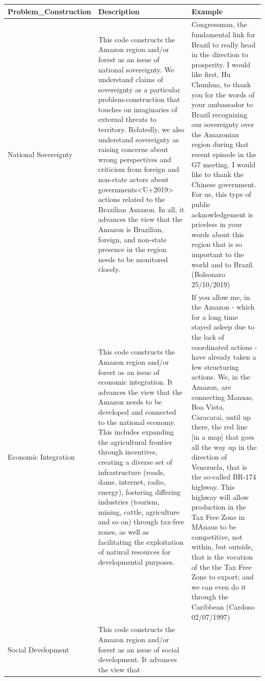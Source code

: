\documentclass[]{interact}
\theoremstyle{plain}%
\theoremstyle{definition}
\theoremstyle{remark}
\begin{document}
\begin{longtable}[]{@{}lll@{}}
\toprule
Problem\_Construction & Description & Example \\
\midrule
\endhead
National Sovereignty & This code constructs the Amazon region and/or
forest as an issue of national sovereignty. We understand claims of
sovereignty as a particular problem-construction that touches on
imaginaries of external threats to territory. Relatedly, we also
understand sovereignty as raising concerns about wrong perspectives and
criticism from foreign and non-state actors about
governments\textless U+2019\textgreater{} actions related to the
Brazilian Amazon. In all, it advances the view that the Amazon is
Brazilian, foreign, and non-state presence in the region needs to be
monitored closely. & Congressman, the fundamental link for Brazil to
really head in the direction to prosperity. I would like first, Hu
Chunhua, to thank you for the words of your ambassador to Brazil
recognizing our sovereignty over the Amazonian region during that recent
episode in the G7 meeting. I would like to thank the Chinese government.
For us, this type of public acknowledgement is priceless in your words
about this region that is so important to the world and to Brazil.
(Bolsonaro 25/10/2019) \\
Economic Integration & This code constructs the Amazon region and/or
forest as an issue of economic integration. It advances the view that
the Amazon needs to be developed and connected to the national economy.
This includes expanding the agricultural frontier through incentives,
creating a diverse set of infrastructure (roads, dams, internet, radio,
energy), fostering differing industries (tourism, mining, cattle,
agriculture and so on) through tax-free zones, as well as facilitating
the exploitation of natural resources for developmental purposes. & If
you allow me, in the Amazon - which for a long time stayed asleep due to
the lack of coordinated actions - have already taken a few structuring
actions. We, in the Amazon, are connecting Manuas, Boa Vista, Caracarai,
until up there, the red line {[}in a map{]} that goes all the way up in
the direction of Venezuela, that is the so-called BR-174 highway. This
highway will allow production in the Tax Free Zone in MAnaus to be
competitive, not within, but outside, that is the vocation of the the
Tax Free Zone to export; and we can even do it through the Caribbean
(Cardoso 02/07/1997) \\
Social Development & This code constructs the Amazon region and/or
forest as an issue of social development. It advances the view that

\end{longtable}
\end{document}
